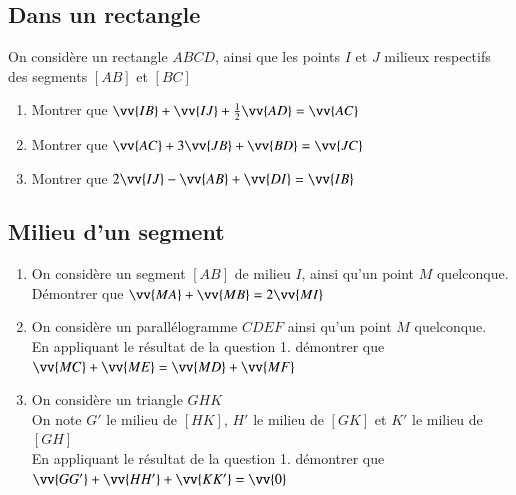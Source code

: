 \documentclass[oneside,12pt]{article}          %
\begin{document}
\subsection{Dans un rectangle}
On considère un rectangle $ABCD$, ainsi que les points $I$ et $J$ milieux respectifs des segments $[AB]$ et $[BC]$
\begin{enumerate}
	\item Montrer que $\vv{IB}+\vv{IJ}+\frac{1}{2}\vv{AD}=\vv{AC}$
	\item Montrer que $\vv{AC}+3\vv{JB}+\vv{BD}=\vv{JC}$
	\item Montrer que $2\vv{IJ}-\vv{AB}+\vv{DI}=\vv{IB}$
\end{enumerate}



\subsection{Milieu d'un segment}
\begin{enumerate}
	\item On considère un segment $[AB]$ de milieu $I$, ainsi qu'un point $M$ quelconque. \\
	Démontrer que $\vv{MA}+\vv{MB}=2\vv{MI}$
	\item On considère un parallélogramme $CDEF$ ainsi qu'un point $M$ quelconque. \\
	En appliquant le résultat de la question 1. démontrer que $\vv{MC}+\vv{ME}=\vv{MD}+\vv{MF}$
	\item On considère un triangle $GHK$\\
	On note $G'$ le milieu de $[HK]$, $H'$ le milieu de $[GK]$ et $K'$ le milieu de $[GH]$ \\
	En appliquant le résultat de la question 1. démontrer que $\vv{GG'}+\vv{HH'}+\vv{KK'}=\vv{0}$
\end{enumerate}
\end{document}
